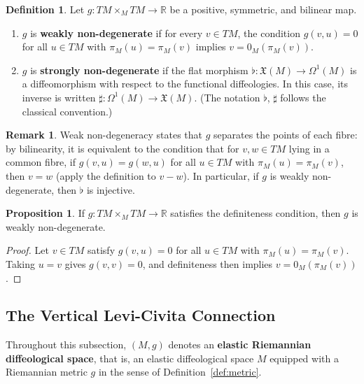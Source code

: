 \documentclass{amsart}
\newcommand{\R}{\mathbb{R}}
\theoremstyle{definition}
\newtheorem{defn}[thm]{Definition}
\newtheorem{rem}[thm]{Remark}
\newtheorem{prop}[thm]{Proposition}
\begin{document}
\begin{defn}\label{def:non-degenerate}
Let $g \colon TM \times_M TM \to \R$ be a positive, symmetric, and bilinear map.
\begin{enumerate}
    \item $g$ is \textbf{weakly non-degenerate} if for every
      $v \in TM$, the condition $g(v, u) = 0$ for all $u \in TM$ with
      $\pi_M(u) = \pi_M(v)$ implies $v = 0_M(\pi_M(v))$.
    \item $g$ is \textbf{strongly non-degenerate} if the flat morphism
      $\flat \colon \mathfrak{X}(M) \to \Omega^1(M)$ is a diffeomorphism
      with respect to the functional diffeologies. In this case, its
      inverse is written $\sharp \colon \Omega^1(M) \to \mathfrak{X}(M)$.
      (The notation $\flat$, $\sharp$ follows the classical convention.)
\end{enumerate}
\end{defn}

\begin{rem}\label{rem:weak-non-degenerate-linear}
  Weak non-degeneracy states that $g$ separates the points of each fibre:
  by bilinearity, it is equivalent to the condition that for
  $v, w \in TM$ lying in a common fibre, if $g(v, u) = g(w, u)$ for all
  $u \in TM$ with $\pi_M(u) = \pi_M(v)$, then $v = w$ (apply the
  definition to $v - w$). In particular, if $g$ is weakly non-degenerate,
  then $\flat$ is injective.
\end{rem}

\begin{prop}\label{prop:definite-implies-weak-nondegenerate}
  If $g \colon TM \times_M TM \to \R$ satisfies the definiteness condition,
  then $g$ is weakly non-degenerate.
\end{prop}

\begin{proof}
  Let $v \in TM$ satisfy $g(v, u) = 0$ for all $u \in TM$ with
  $\pi_M(u) = \pi_M(v)$.
  Taking $u = v$ gives $g(v, v) = 0$, and definiteness then implies
  $v = 0_M(\pi_M(v))$.
\end{proof}

\subsection{The Vertical Levi-Civita Connection}\label{subsec:levi-civita}

Throughout this subsection, $(M, g)$ denotes an \textbf{elastic Riemannian
diffeological space}, that is, an elastic diffeological space $M$ equipped
with a Riemannian metric $g$ in the sense of Definition~\ref{def:metric}.
\end{document}
